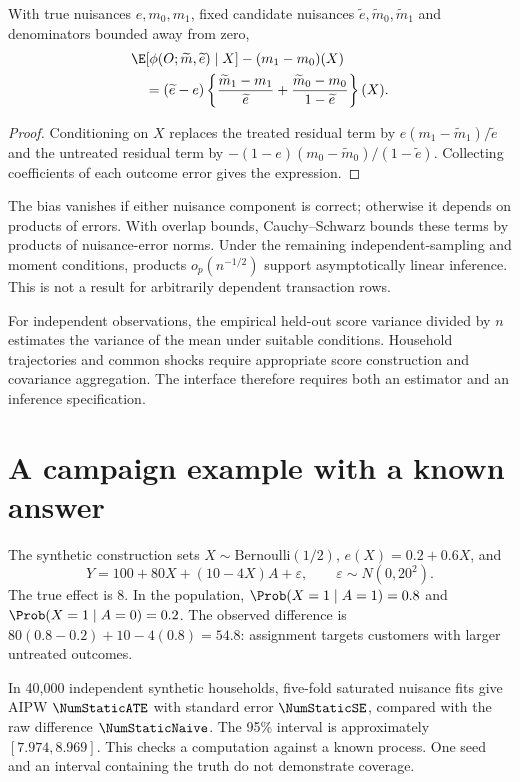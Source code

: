 \begin{proposition}
With true nuisances $e,m_0,m_1$, fixed candidate nuisances
$\widetilde e,\widetilde m_0,\widetilde m_1$ and denominators bounded away
from zero,
\begin{align}
&\E[\phi(O;\widetilde m,\widetilde e)\mid X]-(m_1-m_0)(X)\nonumber\\
&\quad=(\widetilde e-e)
 \left\{\frac{\widetilde m_1-m_1}{\widetilde e}
       +\frac{\widetilde m_0-m_0}{1-\widetilde e}\right\}(X).
 \label{eq:drbias}
\end{align}
\end{proposition}
\begin{proof}
Conditioning on $X$ replaces the treated residual term by
$e(m_1-\widetilde m_1)/\widetilde e$ and the untreated residual term by
$-(1-e)(m_0-\widetilde m_0)/(1-\widetilde e)$. Collecting coefficients of
each outcome error gives the expression.
\end{proof}

The bias vanishes if either nuisance component is correct; otherwise it
depends on products of errors. With overlap bounds, Cauchy--Schwarz bounds
these terms by products of nuisance-error norms. Under the remaining
independent-sampling and moment conditions, products
$o_p(n^{-1/2})$ support asymptotically linear inference. This is not a
result for arbitrarily dependent transaction rows.

For independent observations, the empirical held-out score variance divided
by $n$ estimates the variance of the mean under suitable conditions.
Household trajectories and common shocks require appropriate score
construction and covariance aggregation. The interface therefore requires
both an estimator and an inference specification.

\section{A campaign example with a known answer}
The synthetic construction sets $X\sim\mathrm{Bernoulli}(1/2)$,
$e(X)=0.2+0.6X$, and
\[
 Y=100+80X+(10-4X)A+\varepsilon,\qquad
 \varepsilon\sim N(0,20^2).
\]
The true effect is $8$. In the population,
$\Prob(X=1\mid A=1)=0.8$ and $\Prob(X=1\mid A=0)=0.2$.
The observed difference is $80(0.8-0.2)+10-4(0.8)=54.8$:
assignment targets customers with larger untreated outcomes.

In 40,000 independent synthetic households, five-fold saturated nuisance
fits give AIPW $\NumStaticATE$ with standard error $\NumStaticSE$,
compared with the raw difference $\NumStaticNaive$.
The 95\% interval is approximately $[7.974,8.969]$.
This checks a computation against a known process. One seed and an interval
containing the truth do not demonstrate coverage.

